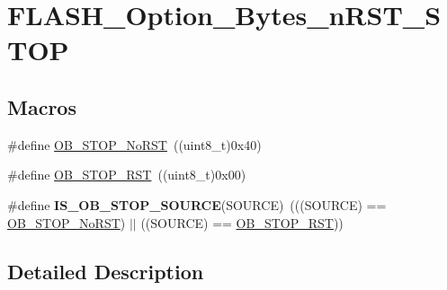 \hypertarget{group___f_l_a_s_h___option___bytes__n_r_s_t___s_t_o_p}{\section{F\-L\-A\-S\-H\-\_\-\-Option\-\_\-\-Bytes\-\_\-n\-R\-S\-T\-\_\-\-S\-T\-O\-P}
\label{group___f_l_a_s_h___option___bytes__n_r_s_t___s_t_o_p}
}
\subsection*{Macros}
\begin{DoxyCompactItemize}
\item 
\#define \hyperlink{group___f_l_a_s_h___option___bytes__n_r_s_t___s_t_o_p_ga6762d6e4045fec58b49dfc03c1927d51}{O\-B\-\_\-\-S\-T\-O\-P\-\_\-\-No\-R\-S\-T}~((uint8\-\_\-t)0x40)
\item 
\#define \hyperlink{group___f_l_a_s_h___option___bytes__n_r_s_t___s_t_o_p_gaef92c03b1f279c532bfa13d3bb074b57}{O\-B\-\_\-\-S\-T\-O\-P\-\_\-\-R\-S\-T}~((uint8\-\_\-t)0x00)
\item 
\hypertarget{group___f_l_a_s_h___option___bytes__n_r_s_t___s_t_o_p_ga131ae3434f300c8317dd6b3b349c7cab}{\#define {\bfseries I\-S\-\_\-\-O\-B\-\_\-\-S\-T\-O\-P\-\_\-\-S\-O\-U\-R\-C\-E}(S\-O\-U\-R\-C\-E)~(((S\-O\-U\-R\-C\-E) == \hyperlink{group___f_l_a_s_h___option___bytes__n_r_s_t___s_t_o_p_ga6762d6e4045fec58b49dfc03c1927d51}{O\-B\-\_\-\-S\-T\-O\-P\-\_\-\-No\-R\-S\-T}) $|$$|$ ((S\-O\-U\-R\-C\-E) == \hyperlink{group___f_l_a_s_h___option___bytes__n_r_s_t___s_t_o_p_gaef92c03b1f279c532bfa13d3bb074b57}{O\-B\-\_\-\-S\-T\-O\-P\-\_\-\-R\-S\-T}))}\label{group___f_l_a_s_h___option___bytes__n_r_s_t___s_t_o_p_ga131ae3434f300c8317dd6b3b349c7cab}

\end{DoxyCompactItemize}


\subsection{Detailed Description}


